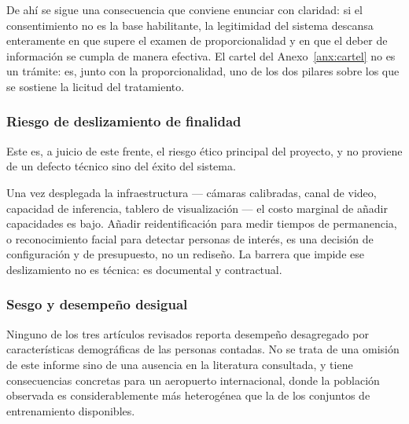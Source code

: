 De ahí se sigue una consecuencia que conviene enunciar con claridad: si
el consentimiento no es la base habilitante, la legitimidad del sistema
descansa enteramente en que supere el examen de proporcionalidad y en que
el deber de información se cumpla de manera efectiva. El cartel del
Anexo~\ref{anx:cartel} no es un trámite: es, junto con la
proporcionalidad, uno de los dos pilares sobre los que se sostiene la
licitud del tratamiento.

\subsubsection{Riesgo de deslizamiento de finalidad}

Este es, a juicio de este frente, el riesgo ético principal del proyecto,
y no proviene de un defecto técnico sino del éxito del sistema.

Una vez desplegada la infraestructura --- cámaras calibradas, canal de
video, capacidad de inferencia, tablero de visualización --- el costo
marginal de añadir capacidades es bajo. Añadir reidentificación para
medir tiempos de permanencia, o reconocimiento facial para detectar
personas de interés, es una decisión de configuración y de presupuesto,
no un rediseño. La barrera que impide ese deslizamiento no es técnica: es
documental y contractual.


\subsubsection{Sesgo y desempeño desigual}

Ninguno de los tres artículos revisados reporta desempeño desagregado por
características demográficas de las personas contadas. No se trata de una
omisión de este informe sino de una ausencia en la literatura consultada,
y tiene consecuencias concretas para un aeropuerto internacional, donde la
población observada es considerablemente más heterogénea que la de los
conjuntos de entrenamiento disponibles.


